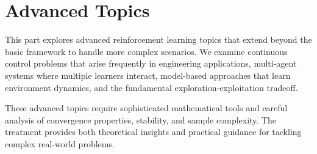 \part{Advanced Topics}

This part explores advanced reinforcement learning topics that extend beyond the basic framework to handle more complex scenarios. We examine continuous control problems that arise frequently in engineering applications, multi-agent systems where multiple learners interact, model-based approaches that learn environment dynamics, and the fundamental exploration-exploitation tradeoff.

These advanced topics require sophisticated mathematical tools and careful analysis of convergence properties, stability, and sample complexity. The treatment provides both theoretical insights and practical guidance for tackling complex real-world problems.




